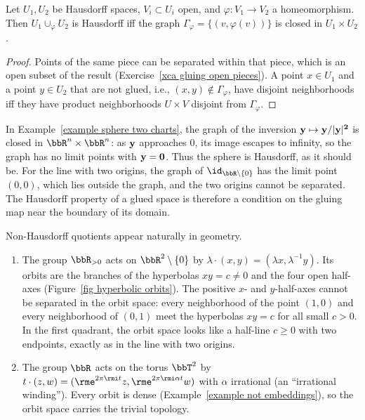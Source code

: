 \begin{prop}\label{prop Hausdorff gluing}
    Let $U_1,U_2$ be Hausdorff spaces, $V_i\subset U_i$ open, and $\varphi:V_1\to V_2$ a homeomorphism. Then $U_1\cup_\varphi U_2$ is Hausdorff iff the graph $\Gamma_\varphi=\{(v,\varphi(v))\}$ is closed in $U_1\times U_2$.
\end{prop}
\begin{proof}
    Points of the same piece can be separated within that piece, which is an open subset of the result (Exercise~\ref{xca gluing open pieces}). A point $x\in U_1$ and a point $y\in U_2$ that are not glued, i.e., $(x,y)\notin\Gamma_\varphi$, have disjoint neighborhoods iff they have product neighborhoods $U\times V$ disjoint from $\Gamma_\varphi$.
\end{proof}

In Example~\ref{example sphere two charts}, the graph of the inversion $\bf{y}\mapsto \bf{y}/\lvert \bf{y}\rvert^2$ is closed in $\bbR^n\times\bbR^n$: as $\bf{y}$ approaches $0$, its image escapes to infinity, so the graph has no limit points with $\bf{y}=0$. Thus the sphere is Hausdorff, as it should be. For the line with two origins, the graph of $\id_{\bbR\setminus\{0\}}$ has the limit point $(0,0)$, which lies outside the graph, and the two origins cannot be separated. The Hausdorff property of a glued space is therefore a condition on the gluing map near the boundary of its domain.

\begin{example}\label{example non-Hausdorff orbit spaces}
    Non-Hausdorff quotients appear naturally in geometry.
    \begin{enumerate}
        \item The group $\bbR_{>0}$ acts on $\bbR^2\setminus\{0\}$ by $\lambda\cdot(x,y)=(\lambda x,\lambda^{-1}y)$. Its orbits are the branches of the hyperbolas $xy=c\neq0$ and the four open half-axes (Figure~\ref{fig hyperbolic orbits}). The positive $x$- and $y$-half-axes cannot be separated in the orbit space: every neighborhood of the point $(1,0)$ and every neighborhood of $(0,1)$ meet the hyperbolas $xy=c$ for all small $c>0$. In the first quadrant, the orbit space looks like a half-line $c\geq0$ with two endpoints, exactly as in the line with two origins.
        \item The group $\bbR$ acts on the torus $\bbT^2$ by $t\cdot(z,w)=(\rme^{2\pi\rmi t}z,\rme^{2\pi\rmi\alpha t}w)$ with $\alpha$ irrational (an ``irrational winding''). Every orbit is dense (Example~\ref{example not embeddings}), so the orbit space carries the trivial topology.
    \end{enumerate}
\end{example}

